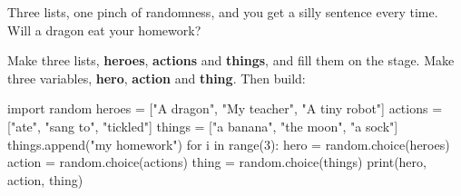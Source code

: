 
Three lists, one pinch of randomness, and you get a silly sentence every time. Will a dragon eat your homework?

\noindent\begin{minipage}[t]{0.68\linewidth}\vspace{0pt}
\begin{scratch}
\end{scratch}
\end{minipage}\hfill\begin{minipage}[t]{0.29\linewidth}\vspace{0pt}
Make three lists, \textbf{heroes}, \textbf{actions} and \textbf{things}, and fill them on the stage. Make three variables, \textbf{hero}, \textbf{action} and \textbf{thing}. Then build:
\end{minipage}



\begin{typethis}
import random
heroes = ["A dragon", "My teacher", "A tiny robot"]
actions = ["ate", "sang to", "tickled"]
things = ["a banana", "the moon", "a sock"]
things.append("my homework")
for i in range(3):
    hero = random.choice(heroes)
    action = random.choice(actions)
    thing = random.choice(things)
    print(hero, action, thing)
\end{typethis}


